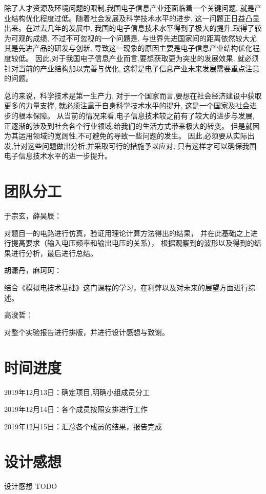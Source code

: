 \documentclass[10pt, conference, compsocconf, a4paper]{IEEEtran}
\begin{document}
除了人才资源及环境问题的限制,我国电子信息产业还面临着一个关键问题,
就是产业结构优化程度过低。随着社会发展及科学技术水平的进步,
这一问题正日益凸显出来。在过去几年的发展中,
我国的电子信息技术水平得到了极大的提升,取得了较为可观的成绩,
不过不可忽视的一个问题是,
与世界先进国家间的距离依然较大尤其是先进产品的研发与创新,
导致这一现象的原因主要是电子信息产业结构优化程度较低。
因此,对于我国电子信息产业而言,要想获取更为突出的发展效果,
就必须针对当前的产业结构加以完善与优化,
这将是电子信息产业未来发展需要重点注意的问题。\cite{chen2014}
\par

总的来说，科学技术是第一生产力,
对于一个国家而言,要想在社会经济建设中获取更多的力量支撑,
就必须注重于自身科学技术水平的提升,
这是一个国家及社会进步的根本保障。
从当前的情况来看,电子信息技术较之前有了较大的进步与发展,
正逐渐的涉及到社会各个行业领域,给我们的生活方式带来极大的转变。
但是就因为其运用领域的宽阔性,不可避免的导致一些问题的发生。
因此,必须要从实际出发,针对这些问题做出分析,并采取可行的措施予以应对,
只有这样才可以确保我国电子信息技术水平的进一步提升。\par


\section{团队分工}

于宗玄，薛昊辰：\par
对题目一的电路进行仿真，验证用理论计算方法得出的结果，
并在此基础之上进行提高要求（输入电压频率和输出电压的关系）， 
根据观察到的波形以及得到的结果进行分析，最后进行总结。

胡潇丹，麻珂珂：\par
结合《模拟电技术基础》这门课程的学习，在利弊以及对未来的展望方面进行综述。

高浚哲：\par
对整个实验报告进行排版，并进行设计感想与致谢。


\section{时间进度}

2019年12月13日：确定项目,明确小组成员分工\par
2019年12月14日：各个成员按照安排进行工作\par
2019年12月15日：汇总各个成员的结果，报告完成\par

\section{设计感想}
设计感想 TODO
\end{document}
